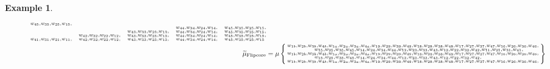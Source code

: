 \documentclass{amsart}
\theoremstyle{plain}
\theoremstyle{definition}
\newtheorem{example}[theorem]{Example}
\theoremstyle{remark}
\newcommand{\muint}[1]{\widetilde{\mu}_{\text{#1}}}
\newcommand{\muflipcore}{\muint{Flipcore}}
\begin{document}
\begin{example}
\begin{figure}[h]
\begin{align*}
{\begin{subarray}{l}
{}
         w_{45}, w_{35}, w_{25}, w_{15}, \\
\phantom{
         w_{41}, w_{31}, w_{21}, w_{11}, \quad
         w_{42}, w_{32}, w_{22}, w_{12}, \quad
         w_{43}, w_{33}, w_{23}, w_{13}, \quad
}
         w_{44}, w_{34}, w_{24}, w_{14}, \quad
         w_{45}, w_{35}, w_{25}, w_{15}, \\
\phantom{
         w_{41}, w_{31}, w_{21}, w_{11}, \quad
         w_{42}, w_{32}, w_{22}, w_{12}, \quad
}
         w_{43}, w_{33}, w_{23}, w_{13}, \quad
         w_{44}, w_{34}, w_{24}, w_{14}, \quad
         w_{45}, w_{35}, w_{25}, w_{15}, \\
\phantom{
         w_{41}, w_{31}, w_{21}, w_{11}, \quad
}
         w_{42}, w_{32}, w_{22}, w_{12}, \quad
         w_{43}, w_{33}, w_{23}, w_{13}, \quad
         w_{44}, w_{34}, w_{24}, w_{14}, \quad
         w_{45}, w_{35}, w_{25}, w_{15}, \\
\phantom{
}
         w_{41}, w_{31}, w_{21}, w_{11}, \quad
         w_{42}, w_{32}, w_{22}, w_{12}, \quad
         w_{43}, w_{33}, w_{23}, w_{13}, \quad
         w_{44}, w_{34}, w_{24}, w_{14}, \quad
         w_{45}, w_{35}, w_{25}, w_{15} \\
          \end{subarray}
        } \\
        \muflipcore &= \mu\Set{
          \begin{subarray}{l}
w_{1b}, w_{2b}, w_{3b}, w_{4b}, w_{1a}, w_{2a}, w_{3a}, w_{4a}, w_{19}, w_{29}, w_{39}, w_{49}, w_{18}, w_{28}, w_{38}, w_{48}, w_{17}, w_{27}, w_{37}, w_{47}, w_{16}, w_{26}, w_{36}, w_{46}, \\
        \qquad \qquad w_{15}, w_{25}, w_{35}, w_{45}, w_{14}, w_{24}, w_{34}, w_{44}, w_{13}, w_{23}, w_{33}, w_{43}, w_{12}, w_{22}, w_{32}, w_{42}, w_{11}, w_{21}, w_{31}, w_{41}, \\
w_{1b}, w_{2b}, w_{3b}, w_{4b}, w_{1a}, w_{2a}, w_{3a}, w_{4a}, w_{19}, w_{29}, w_{39}, w_{49}, w_{18}, w_{28}, w_{38}, w_{48}, w_{17}, w_{27}, w_{37}, w_{47}, w_{16}, w_{26}, w_{36}, w_{46}, \\
        \qquad \qquad w_{15}, w_{25}, w_{35}, w_{45}, w_{14}, w_{24}, w_{34}, w_{44}, w_{13}, w_{23}, w_{33}, w_{43}, w_{12}, w_{22}, w_{32}, w_{42}, \\
w_{1b}, w_{2b}, w_{3b}, w_{4b}, w_{1a}, w_{2a}, w_{3a}, w_{4a}, w_{19}, w_{29}, w_{39}, w_{49}, w_{18}, w_{28}, w_{38}, w_{48}, w_{17}, w_{27}, w_{37}, w_{47}, w_{16}, w_{26}, w_{36}, w_{46}, \\

\end{subarray}}
\end{align*}
\end{figure}
\end{example}
\end{document}
